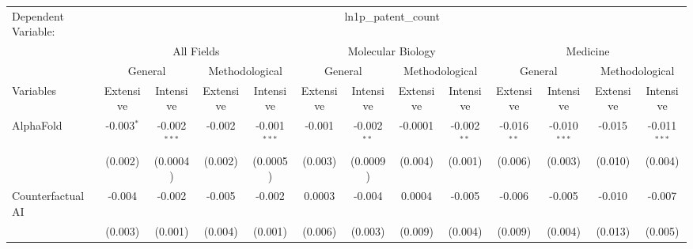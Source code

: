 \begingroup
\centering
\begin{tabular}{lcccccccccccc}
   \tabularnewline \midrule \midrule
   Dependent Variable: & \multicolumn{12}{c}{ln1p\_patent\_count}\\
 & \multicolumn{4}{c}{All Fields} & \multicolumn{4}{c}{Molecular Biology} & \multicolumn{4}{c}{Medicine} \\
\cmidrule(lr){2-5} \cmidrule(lr){6-9} \cmidrule(lr){10-13}
 & \multicolumn{2}{c}{General} & \multicolumn{2}{c}{Methodological} & \multicolumn{2}{c}{General} & \multicolumn{2}{c}{Methodological} & \multicolumn{2}{c}{General} & \multicolumn{2}{c}{Methodological} \\
\cmidrule(lr){2-3} \cmidrule(lr){4-5} \cmidrule(lr){6-7} \cmidrule(lr){8-9} \cmidrule(lr){10-11} \cmidrule(lr){12-13}
Variables & \multicolumn{1}{c}{Extensive} & \multicolumn{1}{c}{Intensive} & \multicolumn{1}{c}{Extensive} & \multicolumn{1}{c}{Intensive} & \multicolumn{1}{c}{Extensive} & \multicolumn{1}{c}{Intensive} & \multicolumn{1}{c}{Extensive} & \multicolumn{1}{c}{Intensive} & \multicolumn{1}{c}{Extensive} & \multicolumn{1}{c}{Intensive} & \multicolumn{1}{c}{Extensive} & \multicolumn{1}{c}{Intensive} \\
\cmidrule(lr){1-1}\cmidrule(lr){2-2} \cmidrule(lr){3-3} \cmidrule(lr){4-4} \cmidrule(lr){5-5} \cmidrule(lr){6-6} \cmidrule(lr){7-7} \cmidrule(lr){8-8} \cmidrule(lr){9-9} \cmidrule(lr){10-10} \cmidrule(lr){11-11} \cmidrule(lr){12-12} \cmidrule(lr){13-13}
   AlphaFold                                & -0.003$^{*}$   & -0.002$^{***}$ & -0.002         & -0.001$^{***}$ & -0.001        & -0.002$^{**}$ & -0.0001       & -0.002$^{**}$ & -0.016$^{**}$ & -0.010$^{***}$ & -0.015        & -0.011$^{***}$\\   
                                            & (0.002)        & (0.0004)       & (0.002)        & (0.0005)       & (0.003)       & (0.0009)      & (0.004)       & (0.001)       & (0.006)       & (0.003)        & (0.010)       & (0.004)\\   
   Counterfactual AI                        & -0.004         & -0.002         & -0.005         & -0.002         & 0.0003        & -0.004        & 0.0004        & -0.005        & -0.006        & -0.005         & -0.010        & -0.007\\   
                                            & (0.003)        & (0.001)        & (0.004)        & (0.001)        & (0.006)       & (0.003)       & (0.009)       & (0.004)       & (0.009)       & (0.004)        & (0.013)       & (0.005)\\   

\end{tabular}
